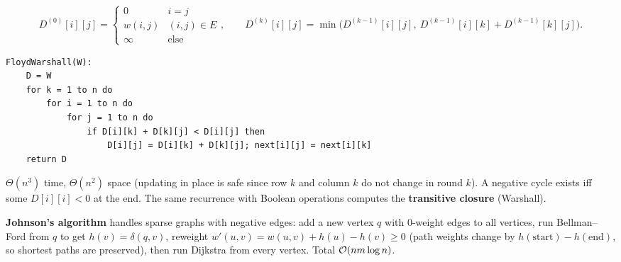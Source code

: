 \begin{center}
\end{center}
\[
D^{(0)}[i][j]=\begin{cases}0 & i=j\\ w(i,j) & (i,j)\in E\\ \infty & \text{else}\end{cases},\qquad
D^{(k)}[i][j]=\min\bigl(D^{(k-1)}[i][j],\ D^{(k-1)}[i][k]+D^{(k-1)}[k][j]\bigr).
\]
\begin{lstlisting}[style=pseudo]
FloydWarshall(W):
    D = W
    for k = 1 to n do
        for i = 1 to n do
            for j = 1 to n do
                if D[i][k] + D[k][j] < D[i][j] then
                    D[i][j] = D[i][k] + D[k][j]; next[i][j] = next[i][k]
    return D
\end{lstlisting}
$\Theta(n^3)$ time, $\Theta(n^2)$ space (updating in place is safe since row $k$ and column $k$ do not change in round $k$).
A negative cycle exists iff some $D[i][i]<0$ at the end.
The same recurrence with Boolean operations computes the \textbf{transitive closure} (Warshall).

\begin{aside}
\textbf{Johnson's algorithm} handles sparse graphs with negative edges: add a new vertex $q$ with 0-weight edges to all vertices, run Bellman--Ford from $q$ to get
$h(v)=\delta(q,v)$, reweight $w'(u,v)=w(u,v)+h(u)-h(v)\ge0$ (path weights change by $h(\text{start})-h(\text{end})$, so shortest paths are preserved), then run Dijkstra from every vertex.
Total $\mathcal{O}(nm\log n)$.
\end{aside}

